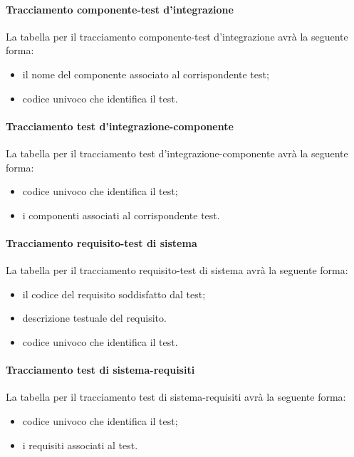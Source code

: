 \paragraph{Tracciamento componente-test d'integrazione}
La tabella per il tracciamento componente-test d'integrazione avrà la seguente forma:
\begin{itemize}
\item {} il nome del componente associato al corrispondente test;
\item {}codice univoco che identifica il test.
\end{itemize}

\paragraph{Tracciamento test d'integrazione-componente}
La tabella per il tracciamento test d'integrazione-componente avrà la seguente forma:
\begin{itemize}
\item {}codice univoco che identifica il test;
\item {} i componenti associati al corrispondente test.
\end{itemize}


\paragraph{Tracciamento requisito-test di sistema}
La tabella per il tracciamento requisito-test di sistema avrà la seguente forma:
\begin{itemize}
\item {} il codice del requisito soddisfatto dal test;
\item {} descrizione testuale del requisito.
\item {}codice univoco che identifica il test.
\end{itemize}

\paragraph{Tracciamento test di sistema-requisiti}
La tabella per il tracciamento test di sistema-requisiti avrà la seguente forma:
\begin{itemize}
\item {}codice univoco che identifica il test;
\item {} i requisiti associati al test.
\end{itemize}

